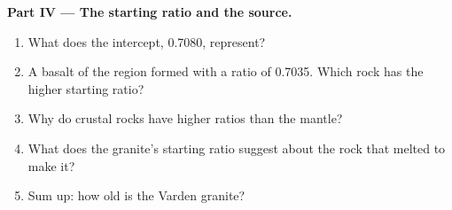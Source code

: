 \begin{problem}
\medskip
\noindent\textbf{Part IV --- The starting ratio and the source.}
\begin{enumerate}[resume]
  \item What does the intercept, 0.7080, represent?
  \item A basalt of the region formed with a ratio of 0.7035. Which rock
        has the higher starting ratio?
  \item Why do crustal rocks have higher ratios than the mantle?
  \item What does the granite's starting ratio suggest about the rock that
        melted to make it?
  \item Sum up: how old is the Varden granite?
\end{enumerate}
\end{problem}
